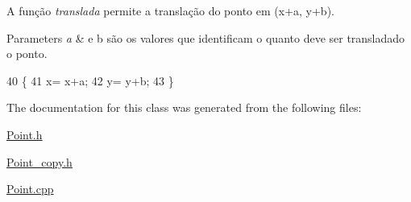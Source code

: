A função {\itshape translada} permite a translação do ponto em (x+a, y+b). 


\begin{DoxyParams}{Parameters}
{\em a} & e b são os valores que identificam o quanto deve ser transladado o ponto. \\
\hline
\end{DoxyParams}

\begin{DoxyCode}
40                                      \{
41        x= x+a;
42        y= y+b;
43 \}
\end{DoxyCode}


The documentation for this class was generated from the following files\+:\begin{DoxyCompactItemize}
\item 
\hyperlink{_point_8h}{Point.\+h}\item 
\hyperlink{_point__copy_8h}{Point\+\_\+copy.\+h}\item 
\hyperlink{_point_8cpp}{Point.\+cpp}\end{DoxyCompactItemize}
